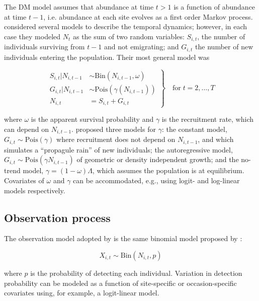 \documentclass[12pt,english]{article}
\begin{document}
\begin{spacing}{1.9}
\begin{flushleft}
The DM model assumes that abundance at time $t>1$ is a function of
abundance at time $t-1$, i.e. abundance at each site evolves as a
first order Markov process. 
\citet{dail_madsen:2011} considered several models to describe the temporal dynamics;
however, in each case they modeled $N_t$ as the sum of two random variables:
$S_{i,t}$, the number of individuals surviving from $t-1$ and not
emigrating; and $G_{i,t}$ the number of new individuals entering
the population. Their most general model was
\begin{linenomath*}
\begin{equation}
\left.\begin{aligned}
S_{i,t}|N_{i,t-1} &\sim \mathrm{Bin}(N_{i,t-1}, \omega) \\
G_{i,t}|N_{i,t-1} &\sim \mathrm{Pois}(\gamma(N_{i,t-1})) \\
N_{i,t} &= S_{i,t}+G_{i,t}
\end{aligned}\right\} \quad \text{for} \; t=2,\hdots,T
\label{eq:Nt}
\end{equation}
\end{linenomath*}
where $\omega$ is the apparent survival probability and $\gamma$
is the recruitment rate, which can depend on $N_{i,t-1}$.
\citet{dail_madsen:2011} proposed three
models for $\gamma$: the constant model,
$G_{i,t} \sim \mathrm{Pois}(\gamma)$ where recruitment does not
depend on $N_{i,t-1}$, and which simulates a ``propagule rain'' of new %
individuals; the autoregressive model, $G_{i,t} \sim
\mathrm{Pois}(\gamma N_{i,t-1})$
of geometric or density independent growth; and the
no-trend model, $\gamma = (1-\omega)\Lambda$, which assumes the
population is at equilibrium. Covariates of
$\omega$ and $\gamma$ can be accommodated, e.g., %
using logit- and log-linear models respectively.


\subsection*{Observation process}

The observation model adopted by \citet{dail_madsen:2011} is the same
binomial model proposed by \citet{royle:2004biom}: 
\begin{linenomath*}
\begin{equation}
  X_{i,t} \sim \mathrm{Bin}(N_{i,t}, p)
  \label{eq:p1}
\end{equation}
\end{linenomath*}
where $p$ is the probability of detecting each individual. Variation
in detection probability can be modeled as a function of site-specific
or occasion-specific covariates using, for example, a logit-linear model.


\end{flushleft}
\end{spacing}
\end{document}
